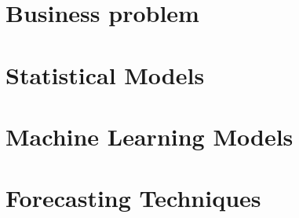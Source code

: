 



\section{Business problem} \label{sec:business_problem}



\section{Statistical Models} \label{sec:statistical_models}



\section{Machine Learning Models}
\label{sec:machine_learning_models}




\section{Forecasting Techniques}
\label{sec:forecasting_techniques}


